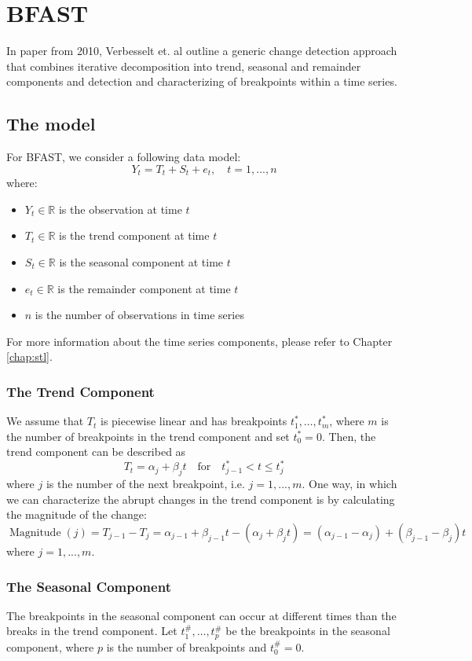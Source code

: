 \documentclass[main.tex]{subfiles}
\begin{document}
\chapter{BFAST}
\label{chap:bfast}
In paper from 2010, Verbesselt et. al \cite{bfast} outline a generic change detection approach
that combines iterative decomposition into trend, seasonal and remainder components and detection
and characterizing of breakpoints within a time series. 

\section{The model}
\label{sec:bfast_the_model}
For BFAST, we consider a following data model:
\[
Y_t = T_t + S_t + e_t, \quad t = 1,...,n
\]
where:
\begin{itemize}
\item $Y_t \in \mathbb{R}$ is the observation at time $t$
\item $T_t \in \mathbb{R}$ is the trend component at time $t$
\item $S_t \in \mathbb{R}$ is the seasonal component at time $t$
\item $e_t \in \mathbb{R}$ is the remainder component at time $t$
\item $n$ is the number of observations in time series
\end{itemize}
For more information about the time series components, please refer to Chapter
\ref{chap:stl}.
\subsection{The Trend Component}
\label{subsec:trend}
We assume that $T_t$ is piecewise linear and has breakpoints $t_1^*,\hdots, t_m^*$,
where $m$ is the number of breakpoints in the trend component and set $t_0^* = 0$.
Then, the trend component can be described as
\[
T_t = \alpha_j + \beta_j t \quad \text{for}\quad t^*_{j-1}<t\leq t_j^*
\]
where $j$ is the number of the next breakpoint, i.e. $j = 1,...,m$. One way, in
which we can characterize the abrupt changes in the trend component is by
calculating the magnitude of the change:
\[
\operatorname{Magnitude}(j) = T_{j-1} - T_{j} = \alpha_{j-1} + \beta_{j-1} t -
(\alpha_j + \beta_j t) = (\alpha_{j-1} - \alpha_j) + (\beta_{j-1} - \beta_j)t
\]
where $j = 1,...,m$.

\subsection{The Seasonal Component}
\label{subsec:seasonal}
The breakpoints in the seasonal component can occur at different times than the
breaks in the trend component. Let
$t_1^{\#},\hdots, t_p^{\#}$ be the breakpoints in the seasonal component,
where $p$ is the number of breakpoints and $t_0^{\#} = 0$.
\end{document}
